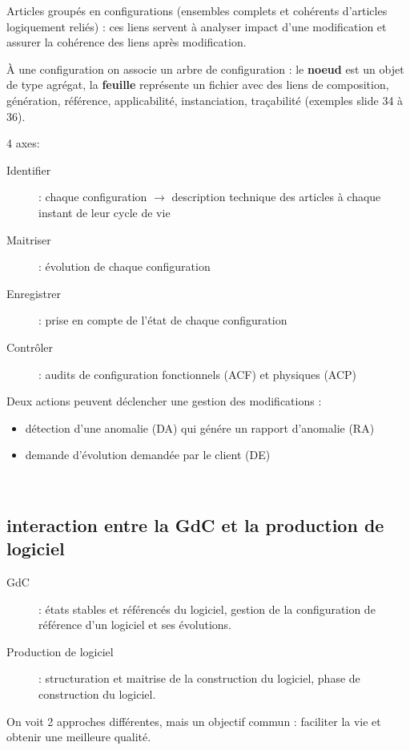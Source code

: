 Articles groupés en configurations (ensembles complets et cohérents d’articles logiquement reliés) : ces liens servent à analyser impact d’une modification et assurer la cohérence des liens après modification.

À une configuration on associe un arbre de configuration : le \textbf{noeud} est un objet de type agrégat, la \textbf{feuille} représente un fichier avec des liens de composition, génération, référence, applicabilité, instanciation, traçabilité (exemples slide 34 à 36).

4 axes:

	\begin{description}
	\item[Identifier] : chaque configuration $\rightarrow$ description technique des articles à chaque instant de leur cycle de vie
	\item[Maitriser] : évolution de chaque configuration
	\item[Enregistrer] : prise en compte de l’état de chaque configuration
	\item[Contrôler] : audits de configuration fonctionnels (ACF) et physiques (ACP)
	\end{description}

Deux actions peuvent déclencher une gestion des modifications :

	\begin{itemize}
	\item détection d’une anomalie (DA) qui génére un rapport d’anomalie (RA)
	\item demande d’évolution demandée par le client (DE)
	\end{itemize}
	\hfill\\

	\subsection{interaction entre la GdC et la production de logiciel}

\begin{description}
	\item[GdC] : états stables et référencés du logiciel, gestion de la configuration de référence d’un logiciel et ses évolutions.
	\item[Production de logiciel] : structuration et maitrise de la construction du logiciel, phase de construction du logiciel.
\end{description}

On voit 2 approches différentes, mais un objectif commun : faciliter la vie et obtenir une meilleure qualité.

